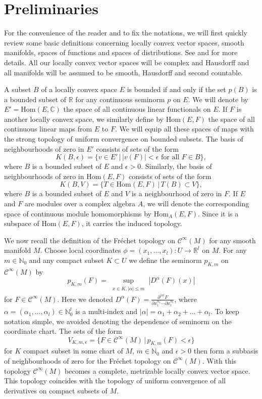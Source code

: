 \documentclass[a4paper]{amsart}
\newcommand{\RR}{\mathbb{R}}
\newcommand{\CC}{\mathbb{C}}
\newcommand{\NN}{\mathbb{N}}
\newcommand{\Hom}{\text{Hom}}
\newcommand{\C}{\mathord{\mathcal{C}^{\infty}}}
\begin{document}
\section{Preliminaries}

For the convenience of the reader and to fix the notations, we will first quickly review some
basic definitions concerning locally convex vector spaces, smooth manifolds, spaces of functions and spaces of distributions. 
See \cite{Tre67} and \cite{Hor67} for more details. All our locally convex vector spaces will be complex and Hausdorff
and all manifolds will be assumed to be smooth, Hausdorff and second countable.

A subset $B$ of a locally convex space $E$ is bounded if and only if the set $p(B)$ is a bounded subset of $\RR$ for any continuous
seminorm $p$ on $E$. We will denote by $E'=\Hom(E,\CC)$ the space of all continuous linear functionals on $E$. 
If $F$ is another locally convex space, we similarly define by $\Hom(E,F)$ the space of all continuous linear maps from $E$ to $F$. 
We will equip all these spaces of maps with the strong topology of uniform
convergence on bounded subsets. The basis of neighbourhoods of zero in $E'$ consists of sets of the form
\[
K(B,\epsilon)=\{v\in E'\,|\,|v(F)|<\epsilon\text{ for all }F\in B\},
\]
where $B$ is a bounded subset of $E$ and $\epsilon>0$. Similarly, the basis of neighbourhoods of zero 
in $\Hom(E,F)$ consists of sets of the form
\[
K(B,V)=\{T\in\Hom(E,F)\,|\,T(B)\subset V\},
\]
where $B$ is a bounded subset of $E$ and $V$ is a neighbourhood of zero in $F$. 
If $E$ and $F$ are modules over a complex algebra $A$, we will denote the corresponding space of continuous module 
homomorphisms by $\Hom_{A}(E,F)$. Since it is a subspace of $\Hom(E,F)$, it carries the induced topology.

We now recall the definition of the Fr\'{e}chet topology on $\C(M)$ for any smooth
manifold $M$. Choose local coordinates $\phi=(x_{1},\ldots,x_{l}):U\to\RR^{l}$ on $M$. For any $m\in\NN_{0}$ and any compact subset $K\subset U$
we define the seminorm $p_{K,m}$ on $\C(M)$ by
\[
p_{K,m}(F)=\sup_{\substack{x\in K,|\alpha|\leq m}}|D^{\alpha}(F)(x)|
\]
for $F\in\C(M)$. Here we denoted $D^{\alpha}(F)=\frac{\partial^{|\alpha|}F}{\partial x_{1}^{\alpha_{1}}\cdots\partial x_{l}^{\alpha_{l}}}$, where 
$\alpha=(\alpha_{1},\ldots,\alpha_{l})\in\NN_{0}^{l}$ is a multi-index and $|\alpha|=\alpha_{1}+\alpha_{2}+\ldots+\alpha_{l}$. To keep
notation simple, we avoided denoting the dependence of seminorm on the coordinate chart. 
The sets of the form
\[
V_{K,m,\epsilon}=\{F\in\C(M)\,|\,p_{K,m}(F)<\epsilon\}
\]
for $K$ compact subset in some chart of $M$, $m\in\NN_{0}$ and $\epsilon>0$ then form a subbasis of neighbourhoods of zero 
for the Fr\'{e}chet topology on $\C(M)$. With this
topology $\C(M)$ becomes a complete, metrizable locally convex vector space. This topology 
coincides with the topology of uniform convergence of all derivatives on compact subsets of $M$.
\end{document}
